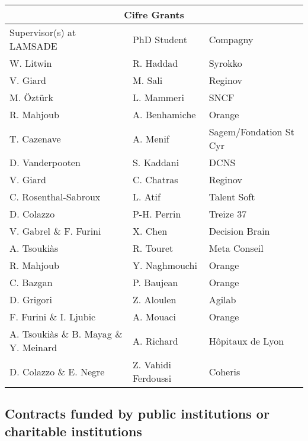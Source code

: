 \documentclass[version=last, pagesize, twoside=semi, DIV=calc, 12pt, a4paper, french, english, bibliography=totoc]{scrartcl}
\begin{document}
\begin{center}
\begin{tabular}{| l | l | l |}
\hline
\multicolumn{3}{|c|}{Cifre Grants}\\
\hline
Supervisor(s) at LAMSADE& PhD Student& Compagny\\
\hline
W. Litwin&R. Haddad&Syrokko\\
V. Giard&M. Sali&Reginov\\
M. \"Ozt\"urk&L. Mammeri&SNCF\\
R. Mahjoub&A. Benhamiche&Orange\\
T. Cazenave&A. Menif&Sagem/Fondation St Cyr\\
D. Vanderpooten&S. Kaddani& DCNS\\
V. Giard&C. Chatras&Reginov\\
C. Rosenthal-Sabroux&L. Atif&Talent Soft\\
D. Colazzo&P-H. Perrin&Treize 37\\
V. Gabrel \& F. Furini&X. Chen&Decision Brain\\
A. Tsouki\`as&R. Touret&Meta Conseil\\
R. Mahjoub&Y. Naghmouchi&Orange\\
C. Bazgan&P. Baujean&Orange\\
D. Grigori&Z. Aloulen&Agilab\\
F. Furini \& I. Ljubic&A. Mouaci&Orange\\
A. Tsouki\`as \& B. Mayag \& Y. Meinard&A. Richard&H\^opitaux de Lyon\\
D. Colazzo \& E. Negre&Z. Vahidi Ferdoussi&Coheris\\
\hline
\end{tabular}
\end{center}



\subsection{Contracts funded by public institutions or charitable institutions}
\end{document}
